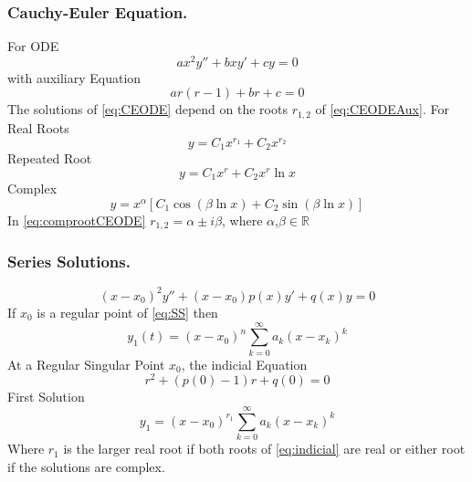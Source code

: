 \documentclass[../../main.tex]{subfiles}
\begin{document}
\subsubsection*{Cauchy-Euler Equation.} For ODE
\begin{equation}
ax^2y''+bxy'+cy=0 \label{eq:CEODE}
\end{equation}
with auxiliary Equation
\begin{equation}
ar(r-1)+br+c=0\label{eq:CEODEAux}
\end{equation}
The solutions of \eqref{eq:CEODE} depend on the roots $r_{1,2}$ of \eqref{eq:CEODEAux}. For Real Roots
\begin{equation*}
y = C_1x^{r_1} + C_2x^{r_2}
\end{equation*}
Repeated Root
\begin{equation*}
y = C_1 x^r + C_2 x^r \ln x
\end{equation*}
Complex
\begin{equation}
y=x^{\alpha}[C_1\cos(\beta \ln x) + C_2 \sin (\beta \ln x)] \label{eq:comprootCEODE}
\end{equation}
In \eqref{eq:comprootCEODE} $r_{1,2}=\alpha\pm i\beta$, where $\alpha$,$\beta\in\mathds{R}$

\subsubsection*{Series Solutions.} 
\begin{equation}
(x-x_0)^2y''+(x-x_0)p(x)y'+q(x)y=0 \label{eq:SS}
\end{equation}
If $x_0$ is a regular point of \eqref{eq:SS} then 
\begin{equation*}
y_1(t) = (x-x_0)^n\sum_{k=0}^{\infty}a_k(x-x_k)^k
\end{equation*}
At a Regular Singular Point $x_0$, the indicial Equation
\begin{equation}
r^2+(p(0)-1)r + q(0)=0 \label{eq:indicial}
\end{equation}
First Solution
\begin{equation*}
y_1=(x-x_0)^{r_1}\sum_{k=0}^{\infty}a_k(x-x_k)^k
\end{equation*}
Where $r_1$ is the larger real root if both roots of \eqref{eq:indicial} are real or either root if the solutions are complex. 
\end{document}
